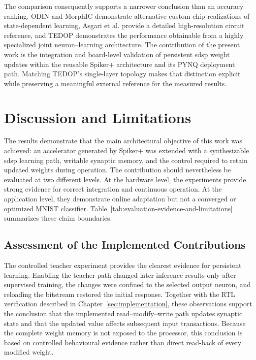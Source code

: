 The comparison consequently supports a narrower conclusion than an accuracy ranking. ODIN and MorphIC demonstrate alternative custom-chip realizations of state-dependent learning, Asgari et al. provide a detailed high-resolution circuit reference, and TEDOP demonstrates the performance obtainable from a highly specialized joint neuron--learning architecture. The contribution of the present work is the integration and board-level validation of persistent \gls{sdsp} weight updates within the reusable Spiker+ architecture and its PYNQ deployment path. Matching TEDOP's single-layer topology makes that distinction explicit while preserving a meaningful external reference for the measured results.

\section{Discussion and Limitations}
\label{subsec:discussion-and-limitations}

The results demonstrate that the main architectural objective of this work was achieved: an accelerator generated by Spiker+ was extended with a synthesizable \gls{sdsp} learning path, writable synaptic memory, and the control required to retain updated weights during operation. The contribution should nevertheless be evaluated at two different levels. At the hardware level, the experiments provide strong evidence for correct integration and continuous operation. At the application level, they demonstrate online adaptation but not a converged or optimized MNIST classifier. Table~\ref{tab:evaluation-evidence-and-limitations} summarizes these claim boundaries.



\subsection{Assessment of the Implemented Contributions}

The controlled teacher experiment provides the clearest evidence for persistent learning. Enabling the teacher path changed later inference results only after supervised training, the changes were confined to the selected output neuron, and reloading the bitstream restored the initial response. Together with the RTL verification described in Chapter~\ref{sec:implementation}, these observations support the conclusion that the implemented read--modify--write path updates synaptic state and that the updated value affects subsequent input transactions. Because the complete weight memory is not exposed to the processor, this conclusion is based on controlled behavioural evidence rather than direct read-back of every modified weight.

